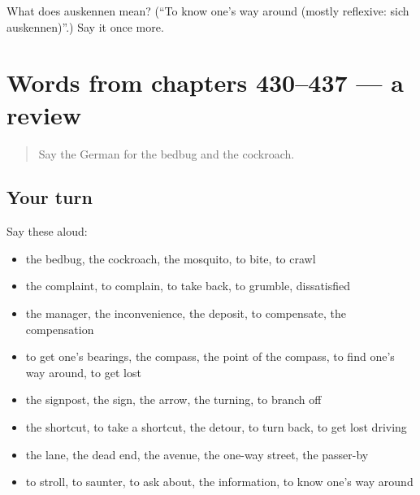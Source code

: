 \begin{tcolorbox}[breakable,colback=teal!4,colframe=teal!35!black,title={Before you move on}]
What does auskennen mean? (\textquotedblleft{}To know one's way around (mostly reflexive: sich auskennen)\textquotedblright{}.) Say it once more.
\end{tcolorbox}
\section[(dialogue)]{Words from chapters 430–437 — a review}

\label{lesson:GE-R437-review-430-437}



\begin{quote}
Say the German for the bedbug and the cockroach.
\end{quote}

\subsection*{Your turn}
Say these aloud:

\begin{itemize}
\raggedright
  \item the bedbug, the cockroach, the mosquito, to bite, to crawl
  \item the complaint, to complain, to take back, to grumble, dissatisfied
  \item the manager, the inconvenience, the deposit, to compensate, the compensation
  \item to get one's bearings, the compass, the point of the compass, to find one's way around, to get lost
  \item the signpost, the sign, the arrow, the turning, to branch off
  \item the shortcut, to take a shortcut, the detour, to turn back, to get lost driving
  \item the lane, the dead end, the avenue, the one-way street, the passer-by
  \item to stroll, to saunter, to ask about, the information, to know one's way around
\end{itemize}

